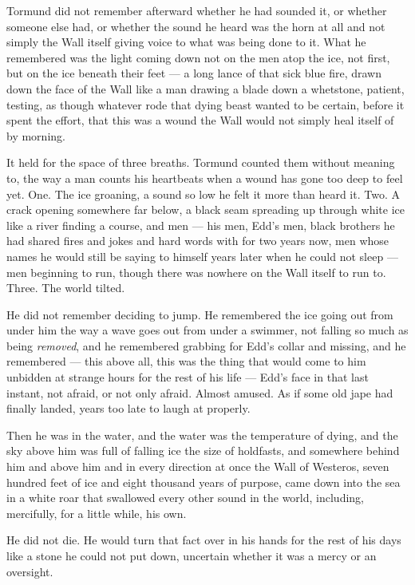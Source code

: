 Tormund did not remember afterward whether he had sounded it, or whether someone else had, or whether the sound he heard was the horn at all and not simply the Wall itself giving voice to what was being done to it. What he remembered was the light coming down not on the men atop the ice, not first, but on the ice beneath their feet — a long lance of that sick blue fire, drawn down the face of the Wall like a man drawing a blade down a whetstone, patient, testing, as though whatever rode that dying beast wanted to be certain, before it spent the effort, that this was a wound the Wall would not simply heal itself of by morning.

It held for the space of three breaths. Tormund counted them without meaning to, the way a man counts his heartbeats when a wound has gone too deep to feel yet. One. The ice groaning, a sound so low he felt it more than heard it. Two. A crack opening somewhere far below, a black seam spreading up through white ice like a river finding a course, and men — his men, Edd’s men, black brothers he had shared fires and jokes and hard words with for two years now, men whose names he would still be saying to himself years later when he could not sleep — men beginning to run, though there was nowhere on the Wall itself to run to. Three. The world tilted.

He did not remember deciding to jump. He remembered the ice going out from under him the way a wave goes out from under a swimmer, not falling so much as being \textit{removed}, and he remembered grabbing for Edd’s collar and missing, and he remembered — this above all, this was the thing that would come to him unbidden at strange hours for the rest of his life — Edd’s face in that last instant, not afraid, or not only afraid. Almost amused. As if some old jape had finally landed, years too late to laugh at properly.

Then he was in the water, and the water was the temperature of dying, and the sky above him was full of falling ice the size of holdfasts, and somewhere behind him and above him and in every direction at once the Wall of Westeros, seven hundred feet of ice and eight thousand years of purpose, came down into the sea in a white roar that swallowed every other sound in the world, including, mercifully, for a little while, his own.

\sceneBreak

He did not die. He would turn that fact over in his hands for the rest of his days like a stone he could not put down, uncertain whether it was a mercy or an oversight.

